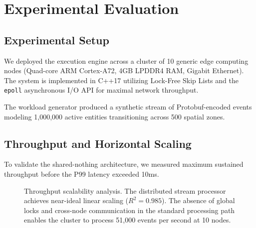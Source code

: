 \documentclass[conference]{IEEEtran}
\begin{document}
\section{Experimental Evaluation}

\subsection{Experimental Setup}
We deployed the execution engine across a cluster of 10 generic edge computing nodes (Quad-core ARM Cortex-A72, 4GB LPDDR4 RAM, Gigabit Ethernet). The system is implemented in C++17 utilizing Lock-Free Skip Lists and the \texttt{epoll} asynchronous I/O API for maximal network throughput. 

The workload generator produced a synthetic stream of Protobuf-encoded events modeling 1,000,000 active entities transitioning across 500 spatial zones. 

\subsection{Throughput and Horizontal Scaling}
To validate the shared-nothing architecture, we measured maximum sustained throughput before the P99 latency exceeded 10ms.

\begin{figure}[htbp]
\centering
{}
\caption{Throughput scalability analysis. The distributed stream processor achieves near-ideal linear scaling ($R^2=0.985$). The absence of global locks and cross-node communication in the standard processing path enables the cluster to process 51,000 events per second at 10 nodes.}
\label{fig:throughput}
\end{figure}
\end{document}
